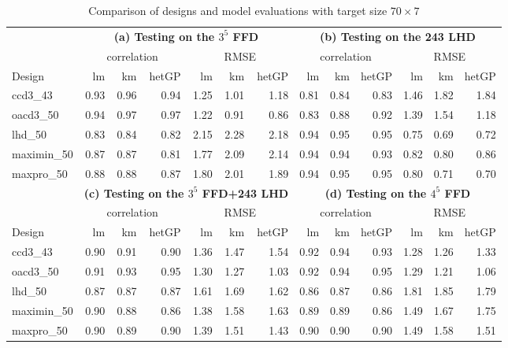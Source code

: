 \documentclass [PhD] {package/uclathes}
\begin{document}
\begin{table}

\caption{\label{tab:tab3}Comparison of designs and model evaluations with target size $70 \times 7$}
\centering
\begin{tabular}[t]{|l|r|r|r|r|r|r|r|r|r|r|r|r|}
\hline
\multicolumn{1}{|c|}{\textbf{ }} & \multicolumn{6}{|c|}{\textbf{(a) Testing on the $3^5$ FFD}} & \multicolumn{6}{|c|}{\textbf{(b) Testing on the 243 LHD}} \\
\cline{2-7} \cline{8-13}
\multicolumn{1}{|c|}{ } & \multicolumn{3}{|c|}{correlation} & \multicolumn{3}{|c|}{RMSE} & \multicolumn{3}{|c|}{correlation} & \multicolumn{3}{|c|}{RMSE} \\
\cline{2-4} \cline{5-7} \cline{8-10} \cline{11-13}
Design & lm & km & hetGP & lm & km & hetGP & lm & km & hetGP & lm & km & hetGP\\
\hline
ccd3\_43 & 0.93 & 0.96 & 0.94 & 1.25 & 1.01 & 1.18 & 0.81 & 0.84 & 0.83 & 1.46 & 1.82 & 1.84\\
\hline
oacd3\_50 & 0.94 & 0.97 & 0.97 & 1.22 & 0.91 & 0.86 & 0.83 & 0.88 & 0.92 & 1.39 & 1.54 & 1.18\\
\hline
lhd\_50 & 0.83 & 0.84 & 0.82 & 2.15 & 2.28 & 2.18 & 0.94 & 0.95 & 0.95 & 0.75 & 0.69 & 0.72\\
\hline
maximin\_50 & 0.87 & 0.87 & 0.81 & 1.77 & 2.09 & 2.14 & 0.94 & 0.94 & 0.93 & 0.82 & 0.80 & 0.86\\
\hline
maxpro\_50 & 0.88 & 0.88 & 0.87 & 1.80 & 2.01 & 1.89 & 0.94 & 0.95 & 0.95 & 0.80 & 0.71 & 0.70\\
\hline
 

\multicolumn{1}{|c|}{\textbf{ }} & \multicolumn{6}{|c|}{\textbf{(c) Testing on the $3^5$ FFD+243 LHD}} & \multicolumn{6}{|c|}{\textbf{(d) Testing on the $4^5$ FFD}} \\
\cline{2-7} \cline{8-13}
\multicolumn{1}{|c|}{ } & \multicolumn{3}{|c|}{correlation} & \multicolumn{3}{|c|}{RMSE} & \multicolumn{3}{|c|}{correlation} & \multicolumn{3}{|c|}{RMSE} \\
\cline{2-4} \cline{5-7} \cline{8-10} \cline{11-13}
Design & lm & km & hetGP & lm & km & hetGP & lm & km & hetGP & lm & km & hetGP\\
\hline
ccd3\_43 & 0.90 & 0.91 & 0.90 & 1.36 & 1.47 & 1.54 & 0.92 & 0.94 & 0.93 & 1.28 & 1.26 & 1.33\\
\hline
oacd3\_50 & 0.91 & 0.93 & 0.95 & 1.30 & 1.27 & 1.03 & 0.92 & 0.94 & 0.95 & 1.29 & 1.21 & 1.06\\
\hline
lhd\_50 & 0.87 & 0.87 & 0.87 & 1.61 & 1.69 & 1.62 & 0.86 & 0.87 & 0.86 & 1.81 & 1.85 & 1.79\\
\hline
maximin\_50 & 0.90 & 0.88 & 0.86 & 1.38 & 1.58 & 1.63 & 0.89 & 0.89 & 0.86 & 1.49 & 1.67 & 1.75\\
\hline
maxpro\_50 & 0.90 & 0.89 & 0.90 & 1.39 & 1.51 & 1.43 & 0.90 & 0.90 & 0.90 & 1.49 & 1.58 & 1.51\\
\hline
\end{tabular}
\end{table} 
\end{document}
